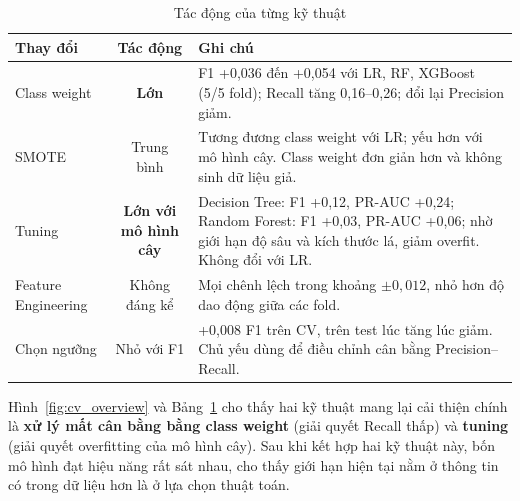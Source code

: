 \begin{table}[H]
\centering
\small
\begin{tabular}{l c p{9cm}}
\toprule
\textbf{Thay đổi} & \textbf{Tác động} & \textbf{Ghi chú} \\
\midrule
Class weight & \textbf{Lớn} & F1 +0,036 đến +0,054 với LR, RF, XGBoost (5/5 fold); Recall tăng 0,16--0,26; đổi lại Precision giảm. \\
SMOTE & Trung bình & Tương đương class weight với LR; yếu hơn với mô hình cây. Class weight đơn giản hơn và không sinh dữ liệu giả. \\
Tuning & \textbf{Lớn với mô hình cây} & Decision Tree: F1 +0,12, PR-AUC +0,24; Random Forest: F1 +0,03, PR-AUC +0,06; nhờ giới hạn độ sâu và kích thước lá, giảm overfit. Không đổi với LR. \\
Feature Engineering & Không đáng kể & Mọi chênh lệch trong khoảng $\pm 0{,}012$, nhỏ hơn độ dao động giữa các fold. \\
Chọn ngưỡng & Nhỏ với F1 & +0,008 F1 trên CV, trên test lúc tăng lúc giảm. Chủ yếu dùng để điều chỉnh cân bằng Precision--Recall. \\
\bottomrule
\end{tabular}
\caption{Tác động của từng kỹ thuật}
\label{tab:summary_effects}
\end{table}

Hình~\ref{fig:cv_overview} và Bảng~\ref{tab:summary_effects} cho thấy hai kỹ thuật mang lại cải thiện chính là \textbf{xử lý mất cân bằng bằng class weight} (giải quyết Recall thấp) và \textbf{tuning} (giải quyết overfitting của mô hình cây). Sau khi kết hợp hai kỹ thuật này, bốn mô hình đạt hiệu năng rất sát nhau, cho thấy giới hạn hiện tại nằm ở thông tin có trong dữ liệu hơn là ở lựa chọn thuật toán.
